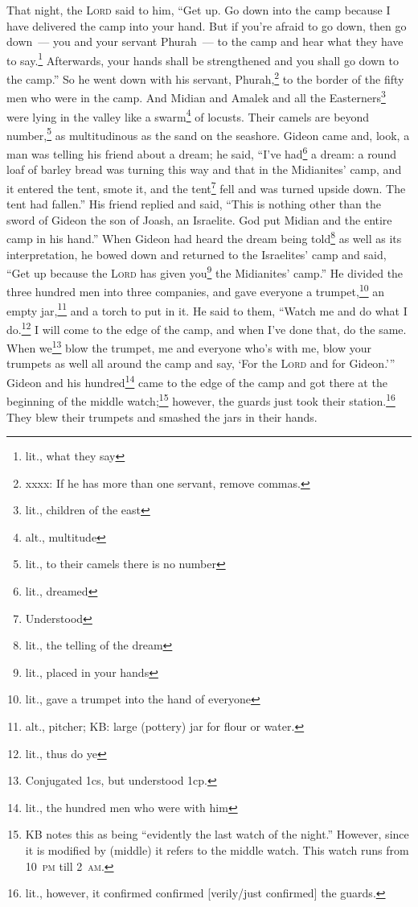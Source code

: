 \begin{inparaenum}
     That night, the \textsc{Lord} said to him, ``Get up. Go down into the camp because I have delivered the camp into your hand.%
     But if you're afraid to go down, then go down~--- you and your servant Phurah~--- to the camp%
     and hear what they have to say.\footnote{lit., what they say} Afterwards, your hands shall be strengthened and you shall go down to the camp.'' So he went down with his servant, Phurah,\footnote{xxxx: If he has more than one servant, remove commas.} to the border of the fifty men who were in the camp.%
     And Midian and Amalek and all the Easterners\footnote{lit., children of the east} were lying in the valley like a swarm\footnote{alt., multitude} of locusts. Their camels are beyond number,\footnote{lit., to their camels there is no number} as multitudinous as the sand on the seashore.%
     Gideon came and, look, a man was telling his friend about a dream; he said, ``I've had\footnote{lit., dreamed} a dream: a round loaf of barley bread was turning this way and that in the Midianites' camp, and it entered the tent, smote it, and the tent\footnote{Understood} fell and was turned upside down. The tent had fallen.''%
     His friend replied and said, ``This is nothing other than the sword of Gideon the son of Joash, an Israelite. God put Midian and the entire camp in his hand.''%
     When Gideon had heard the dream being told\footnote{lit., the telling of the dream} as well as its interpretation, he bowed down and returned to the Israelites' camp and said, ``Get up because the \textsc{Lord} has given you\footnote{lit., placed in your hands} the Midianites' camp.''%
     He divided the three hundred men into three companies, and gave everyone a trumpet,\footnote{lit., gave a trumpet into the hand of everyone} an empty jar,\footnote{alt., pitcher; KB: large (pottery) jar for flour or water.} and a torch to put in it.%
     He said to them, ``Watch me and do what I do.\footnote{lit., thus do ye} I will come to the edge of the camp, and when I've done that, do the same.%
     When we\footnote{Conjugated 1cs, but understood 1cp.} blow the trumpet, me and everyone who's with me, blow your trumpets as well all around the camp and say, `For the \textsc{Lord} and for Gideon.'\thinspace''%
     Gideon and his hundred\footnote{lit., the hundred men who were with him} came to the edge of the camp and got there at the beginning of the middle watch;\footnote{KB notes this as being ``evidently the last watch of the night.'' However, since it is modified by  (middle) it refers to the middle watch. This watch runs from 10~\textsc{pm} till 2~\textsc{am}.} however, the guards just took their station.\footnote{lit., however, it confirmed confirmed [verily/just confirmed] the guards.} They blew their trumpets and smashed the jars in their hands.%

\end{inparaenum}
